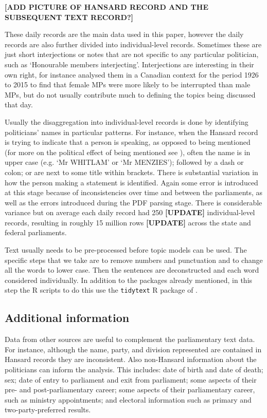 \documentclass[12pt,]{article}
\theoremstyle{definition}
\theoremstyle{definition}
\theoremstyle{definition}
\theoremstyle{remark}
\begin{document}
\textbf{{[}ADD PICTURE OF HANSARD RECORD AND THE SUBSEQUENT TEXT
RECORD?{]}}

These daily records are the main data used in this paper, however the
daily records are also further divided into individual-level records.
Sometimes these are just short interjections or notes that are not
specific to any particular politician, such as `Honourable members
interjecting'. Interjections are interesting in their own right, for
instance \citet{Whyte2017} analysed them in a Canadian context for the
period 1926 to 2015 to find that female MPs were more likely to be
interrupted than male MPs, but do not usually contribute much to
defining the topics being discussed that day.

Usually the disaggregation into individual-level records is done by
identifying politicians' names in particular patterns. For instance,
when the Hansard record is trying to indicate that a person is speaking,
as opposed to being mentioned (for more on the political effect of being
mentioned see \citet{Alexander2018}), often the name is in upper case
(e.g. `Mr WHITLAM' or `Mr MENZIES'); followed by a dash or colon; or are
next to some title within brackets. There is substantial variation in
how the person making a statement is identified. Again some error is
introduced at this stage because of inconsistencies over time and
between the parliaments, as well as the errors introduced during the PDF
parsing stage. There is considerable variance but on average each daily
record had 250 \textbf{{[}UPDATE{]}} individual-level records, resulting
in roughly 15 million rows \textbf{{[}UPDATE{]}} across the state and
federal parliaments.

Text usually needs to be pre-processed before topic models can be used.
The specific steps that we take are to remove numbers and punctuation
and to change all the words to lower case. Then the sentences are
deconstructed and each word considered individually. In addition to the
packages already mentioned, in this step the R scripts to do this use
the \texttt{tidytext} R package of \citet{SilgeRobinson2016}.

\subsection{Additional information}\label{additional-information}

Data from other sources are useful to complement the parliamentary text
data. For instance, although the name, party, and division represented
are contained in Hansard records they are inconsistent. Also non-Hansard
information about the politicians can inform the analysis. This
includes: date of birth and date of death; sex; date of entry to
parliament and exit from parliament; some aspects of their pre- and
post-parliamentary career; some aspects of their parliamentary career,
such as ministry appointments; and electoral information such as primary
and two-party-preferred results.
\end{document}
